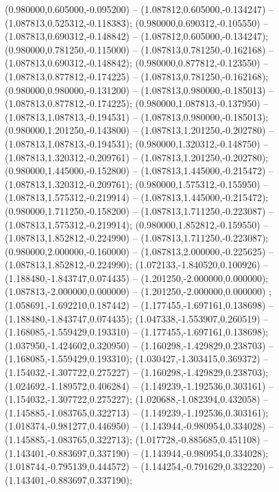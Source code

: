  (0.980000,0.605000,-0.095200) -- (1.087812,0.605000,-0.134247) -- (1.087813,0.525312,-0.118383);
 (0.980000,0.690312,-0.105550) -- (1.087813,0.690312,-0.148842) -- (1.087812,0.605000,-0.134247);
 (0.980000,0.781250,-0.115000) -- (1.087813,0.781250,-0.162168) -- (1.087813,0.690312,-0.148842);
 (0.980000,0.877812,-0.123550) -- (1.087813,0.877812,-0.174225) -- (1.087813,0.781250,-0.162168);
 (0.980000,0.980000,-0.131200) -- (1.087813,0.980000,-0.185013) -- (1.087813,0.877812,-0.174225);
 (0.980000,1.087813,-0.137950) -- (1.087813,1.087813,-0.194531) -- (1.087813,0.980000,-0.185013);
 (0.980000,1.201250,-0.143800) -- (1.087813,1.201250,-0.202780) -- (1.087813,1.087813,-0.194531);
 (0.980000,1.320312,-0.148750) -- (1.087813,1.320312,-0.209761) -- (1.087813,1.201250,-0.202780);
 (0.980000,1.445000,-0.152800) -- (1.087813,1.445000,-0.215472) -- (1.087813,1.320312,-0.209761);
 (0.980000,1.575312,-0.155950) -- (1.087813,1.575312,-0.219914) -- (1.087813,1.445000,-0.215472);
 (0.980000,1.711250,-0.158200) -- (1.087813,1.711250,-0.223087) -- (1.087813,1.575312,-0.219914);
 (0.980000,1.852812,-0.159550) -- (1.087813,1.852812,-0.224990) -- (1.087813,1.711250,-0.223087);
 (0.980000,2.000000,-0.160000) -- (1.087813,2.000000,-0.225625) -- (1.087813,1.852812,-0.224990);
 (1.072133,-1.840520,0.100926) -- (1.188480,-1.843747,0.074435) -- (1.201250,-2.000000,0.000000);
 (1.087813,-2.000000,0.000000) -- (1.201250,-2.000000,0.000000) ;
 (1.058691,-1.692210,0.187442) -- (1.177455,-1.697161,0.138698) -- (1.188480,-1.843747,0.074435);
 (1.047338,-1.553907,0.260519) -- (1.168085,-1.559429,0.193310) -- (1.177455,-1.697161,0.138698);
 (1.037950,-1.424602,0.320950) -- (1.160298,-1.429829,0.238703) -- (1.168085,-1.559429,0.193310);
 (1.030427,-1.303415,0.369372) -- (1.154032,-1.307722,0.275227) -- (1.160298,-1.429829,0.238703);
 (1.024692,-1.189572,0.406284) -- (1.149239,-1.192536,0.303161) -- (1.154032,-1.307722,0.275227);
 (1.020688,-1.082394,0.432058) -- (1.145885,-1.083765,0.322713) -- (1.149239,-1.192536,0.303161);
 (1.018374,-0.981277,0.446950) -- (1.143944,-0.980954,0.334028) -- (1.145885,-1.083765,0.322713);
 (1.017728,-0.885685,0.451108) -- (1.143401,-0.883697,0.337190) -- (1.143944,-0.980954,0.334028);
 (1.018744,-0.795139,0.444572) -- (1.144254,-0.791629,0.332220) -- (1.143401,-0.883697,0.337190);
